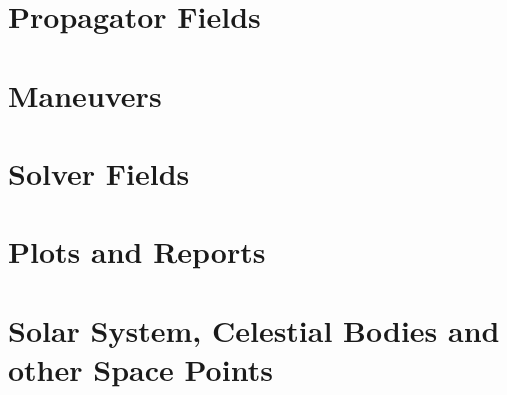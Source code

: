 \documentclass[10 pt]{book}
\begin{document}








\section{Propagator Fields}





\section{Maneuvers}





\section{Solver Fields}





\section{Plots and Reports}







\section{Solar System, Celestial Bodies and other Space Points}












\end{document}
